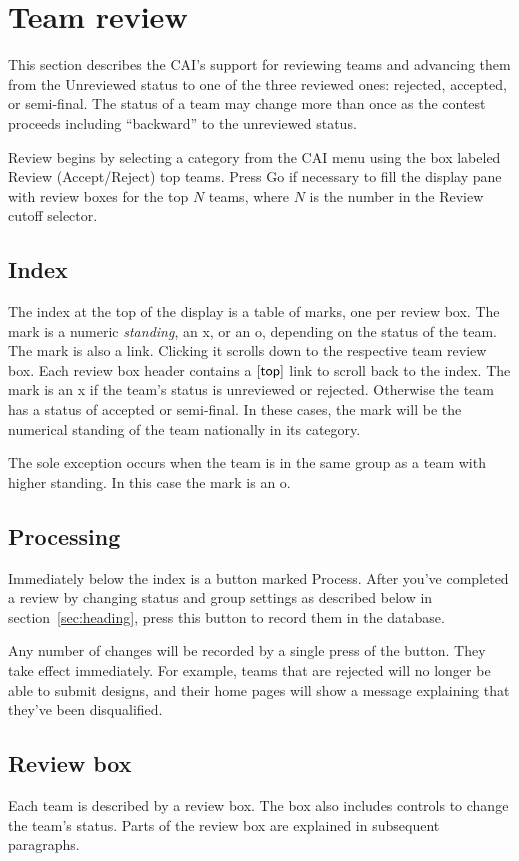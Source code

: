 \documentclass[11pt,letterpaper]{refart}
\def\ui#1{\textsf{#1}}
\begin{document}
\section{Team review}
This section describes the CAI's support for reviewing teams and advancing
them from the Unreviewed status to one of the three reviewed ones: rejected,
accepted, or semi-final. The status of a team may change more than once as
the contest proceeds including ``backward'' to the unreviewed status.

Review begins by selecting a category from the CAI menu using the box labeled
\ui{Review (Accept/Reject) top teams}. Press \ui{Go} if necessary to fill
the display pane with review boxes for the top $N$ teams, where $N$ is the number
in the \ui{Review cutoff} selector. 

\subsection{Index}
The index at the top of the display is a table of marks, one per review box. The 
mark is a numeric \emph{standing}, an \ui{x}, or an \ui{o}, depending on the status of
the team. The mark is also a link. Clicking it scrolls down to the respective team
review box. Each review box header contains a $[\hbox{\ui{top}}]$ link to scroll
back to the index. The mark is an \ui{x} if the team's status is unreviewed or
rejected. Otherwise the team has a status of accepted or semi-final. In these 
cases, the mark will be the numerical standing of the team nationally in its
category.

The sole exception occurs when the team is in the same group as a 
team with higher standing. In this case the mark is an \ui{o}.

\subsection{Processing}
Immediately below the index is a button marked \ui{Process}. After you've 
completed a review by changing status and group settings as described below
in section~\ref{sec:heading}, press this button to record them in the database. 

Any number of changes will be recorded by a single press of the button.
They take effect immediately. For example, teams that are rejected will no longer be 
able to submit designs, and their home pages will show a message explaining that 
they've been disqualified.

\subsection{Review box}
Each team is described by a review box. The box also includes controls to change
the team's status. Parts of the review box are explained in subsequent paragraphs.
\end{document}
